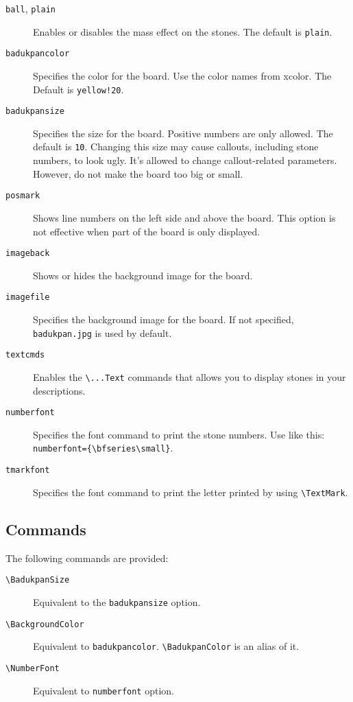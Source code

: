 \documentclass[a4paper]{oblivoir}
\def\bs{\textbackslash}
\begin{document}
\begin{description}
\item [\texttt{ball}, \texttt{plain}] 
Enables or disables the mass effect on the stones. The default is \texttt{plain}.
\item [\texttt{badukpancolor}] 
Specifies the color for the board.
Use the color names from 
\textsf{xcolor}. 
The Default is 
\texttt{yellow!20}.
\item [\texttt{badukpansize}] 
Specifies the size for
the board.
Positive numbers are only allowed.
The default is
\texttt{10}. 
Changing this size may cause callouts, including stone numbers, to look ugly. It's allowed to change callout-related parameters. However, do not make the board too big or small.

\item [\texttt{posmark}] 
Shows line numbers on the left side
and above the board. This option is not effective when part of the board is only displayed.
\item [\texttt{imageback}] 
Shows or hides the background image for the board.

\item [\texttt{imagefile}] 
Specifies the background image for the board. If not specified, \texttt{badukpan.jpg} is used by default.
\item [\texttt{textcmds}] Enables the \verb|\...Text| commands that allows you to display stones in your descriptions. 

\item [\texttt{numberfont}] Specifies the font command to print the stone numbers. Use like this: \texttt{numberfont=\{\bs bfseries\bs small\}}.
\item [\texttt{tmarkfont}] Specifies the font command to print the letter printed by using \verb|\TextMark|.
\end{description}

\subsection{%
Commands
}
The following commands are provided:

\begin{description}
\item [\texttt{\bs BadukpanSize}] 
Equivalent to the \verb|badukpansize| option. 
\item [\texttt{\bs BackgroundColor}] 
Equivalent to \verb|badukpancolor|.
\verb|\BadukpanColor| is an alias of it.
\item [\texttt{\bs NumberFont}] 
Equivalent to \verb|numberfont| option.

\end{description}
\end{document}
